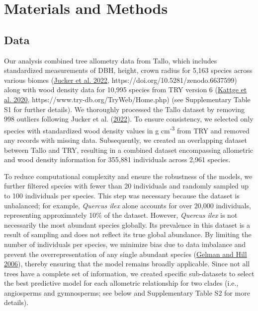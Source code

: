 \documentclass[
  12pt,
  letterpaper,
  DIV=11,
  numbers=noendperiod]{scrartcl}
\begin{document}
\hypertarget{materials-and-methods}{%
\section{Materials and Methods}\label{materials-and-methods}}

\hypertarget{data}{%
\subsection{Data}\label{data}}

Our analysis combined tree allometry data from Tallo, which includes
standardized measurements of DBH, height, crown radius for 5,163 species
across various biomes (\protect\hyperlink{ref-Jucker2022}{Jucker et al.
2022}, https://doi.org/10.5281/zenodo.6637599) along with wood density
data for 10,995 species from TRY version 6
(\protect\hyperlink{ref-Kattge2020}{Kattge et al. 2020},
https://www.try-db.org/TryWeb/Home.php) (see Supplementary Table S1 for
further details). We thoroughly processed the Tallo dataset by removing
998 outliers following Jucker et al.
(\protect\hyperlink{ref-Jucker2022}{2022}). To ensure consistency, we
selected only species with standardized wood density values in g
cm\textsuperscript{-3} from TRY and removed any records with missing
data. Subsequently, we created an overlapping dataset between Tallo and
TRY, resulting in a combined dataset encompassing allometric and wood
density information for 355,881 individuals across 2,961 species.

To reduce computational complexity and ensure the robustness of the
models, we further filtered species with fewer than 20 individuals and
randomly sampled up to 100 individuals per species. This step was
necessary because the dataset is unbalanced; for example, \emph{Quercus
ilex} alone accounts for over 20,000 individuals, representing
approximately 10\% of the dataset. However, \emph{Quercus ilex} is not
necessarily the most abundant species globally. Its prevalence in this
dataset is a result of sampling and does not reflect its true global
abundance. By limiting the number of individuals per species, we
minimize bias due to data imbalance and prevent the overrepresentation
of any single abundant species
(\protect\hyperlink{ref-Gelman2006}{Gelman and Hill 2006}), thereby
ensuring that the model remains broadly applicable. Since not all trees
have a complete set of information, we created specific sub-datasets to
select the best predictive model for each allometric relationship for
two clades (i.e., angiosperms and gymnosperms; see below and
Supplementary Table S2 for more details).
\end{document}
